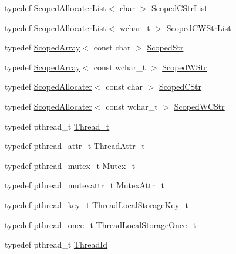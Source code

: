 \begin{DoxyCompactItemize}
typedef \hyperlink{classmocha_1_1_scoped_allocater_list}{ScopedAllocaterList}$<$ char $>$ \hyperlink{namespacemocha_a9fd5cb0f5cf48fb1391e6214b4ce1e57}{ScopedCStrList}
\item 
typedef \hyperlink{classmocha_1_1_scoped_allocater_list}{ScopedAllocaterList}$<$ wchar\_\-t $>$ \hyperlink{namespacemocha_aa47aa86b8def9202e92891d26d17c6fb}{ScopedCWStrList}
\item 
typedef \hyperlink{classmocha_1_1_scoped_array}{ScopedArray}$<$ const char $>$ \hyperlink{namespacemocha_ac9ec76d00dcf0c61c75a2b998115dc07}{ScopedStr}
\item 
typedef \hyperlink{classmocha_1_1_scoped_array}{ScopedArray}$<$ const wchar\_\-t $>$ \hyperlink{namespacemocha_a38514bf0742fae0e0cc6940a4c2e0071}{ScopedWStr}
\item 
typedef \hyperlink{classmocha_1_1_scoped_allocater}{ScopedAllocater}$<$ const char $>$ \hyperlink{namespacemocha_a3f8a89f92e0d05e36bd62f2bb382b31e}{ScopedCStr}
\item 
typedef \hyperlink{classmocha_1_1_scoped_allocater}{ScopedAllocater}$<$ const wchar\_\-t $>$ \hyperlink{namespacemocha_a1ff5dcd4de7797a2612a2b290e279058}{ScopedWCStr}
\item 
typedef pthread\_\-t \hyperlink{namespacemocha_a276b270de0392644f77c3ba4323fa7b1}{Thread\_\-t}
\item 
typedef pthread\_\-attr\_\-t \hyperlink{namespacemocha_a313fa15a2b35cd776ba8a03af06e4910}{ThreadAttr\_\-t}
\item 
typedef pthread\_\-mutex\_\-t \hyperlink{namespacemocha_a7d7ee3c4481d1e56611227f6d0f64c9e}{Mutex\_\-t}
\item 
typedef pthread\_\-mutexattr\_\-t \hyperlink{namespacemocha_aa6ad34d20d975440c46c6d1d2a7aa750}{MutexAttr\_\-t}
\item 
typedef pthread\_\-key\_\-t \hyperlink{namespacemocha_a47a856b5a5c202b2292502aaaaadce75}{ThreadLocalStorageKey\_\-t}
\item 
typedef pthread\_\-once\_\-t \hyperlink{namespacemocha_ada647d8e6d9802c8b822352d3f257e15}{ThreadLocalStorageOnce\_\-t}
\item 
typedef pthread\_\-t \hyperlink{namespacemocha_a9fcf48a10671a66cd922f7e21d6efb6b}{ThreadId}
\end{DoxyCompactItemize}
